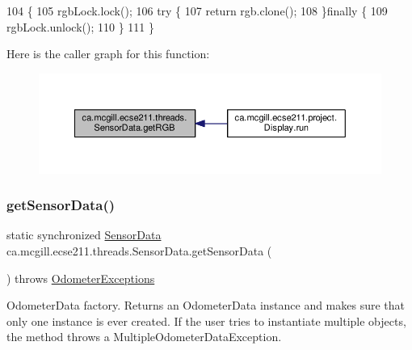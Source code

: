 \begin{DoxyCode}
104                         \{
105     rgbLock.lock();
106     \textcolor{keywordflow}{try} \{
107       \textcolor{keywordflow}{return} rgb.clone();
108     \}\textcolor{keywordflow}{finally} \{
109       rgbLock.unlock();
110     \}
111   \}
\end{DoxyCode}
Here is the caller graph for this function\+:\nopagebreak
\begin{figure}[H]
\begin{center}
\leavevmode
\includegraphics[width=350pt]{classca_1_1mcgill_1_1ecse211_1_1threads_1_1_sensor_data_a76313564e284f5cdb66aefce4e595f3b_icgraph}
\end{center}
\end{figure}
\mbox{\label{classca_1_1mcgill_1_1ecse211_1_1threads_1_1_sensor_data_a8260aba53b4474ca1275e4ce26157977}} 
\subsubsection{\texorpdfstring{get\+Sensor\+Data()}{getSensorData()}}
{\footnotesize\ttfamily static synchronized \hyperlink{classca_1_1mcgill_1_1ecse211_1_1threads_1_1_sensor_data}{Sensor\+Data} ca.\+mcgill.\+ecse211.\+threads.\+Sensor\+Data.\+get\+Sensor\+Data (\begin{DoxyParamCaption}{ }\end{DoxyParamCaption}) throws \hyperlink{classca_1_1mcgill_1_1ecse211_1_1odometer_1_1_odometer_exceptions}{Odometer\+Exceptions}\hspace{0.3cm}{\ttfamily [static]}}

Odometer\+Data factory. Returns an Odometer\+Data instance and makes sure that only one instance is ever created. If the user tries to instantiate multiple objects, the method throws a Multiple\+Odometer\+Data\+Exception.

